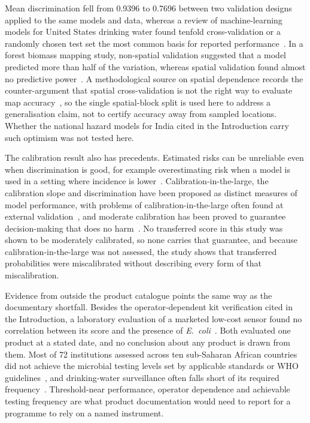 \documentclass[10pt,letterpaper]{article}
\begin{document}
Mean discrimination fell from 0.9396 to 0.7696 between two validation designs applied to the same models and data, whereas a review of machine-learning models for United States drinking water found tenfold cross-validation or a randomly chosen test set the most common basis for reported performance~\cite{Hu2023}. In a forest biomass mapping study, non-spatial validation suggested that a model predicted more than half of the variation, whereas spatial validation found almost no predictive power~\cite{Ploton2020}. A methodological source on spatial dependence records the counter-argument that spatial cross-validation is not the right way to evaluate map accuracy~\cite{MeyerPebesma2022}, so the single spatial-block split is used here to address a generalisation claim, not to certify accuracy away from sampled locations. Whether the national hazard models for India cited in the Introduction carry such optimism was not tested here.

The calibration result also has precedents. Estimated risks can be unreliable even when discrimination is good, for example overestimating risk when a model is used in a setting where incidence is lower~\cite{VanCalster2019}. Calibration-in-the-large, the calibration slope and discrimination have been proposed as distinct measures of model performance, with problems of calibration-in-the-large often found at external validation~\cite{SteyerbergVergouwe2014}, and moderate calibration has been proved to guarantee decision-making that does no harm~\cite{VanCalster2016}. No transferred score in this study was shown to be moderately calibrated, so none carries that guarantee, and because calibration-in-the-large was not assessed, the study shows that transferred probabilities were miscalibrated without describing every form of that miscalibration.

Evidence from outside the product catalogue points the same way as the documentary shortfall. Besides the operator-dependent kit verification cited in the Introduction, a laboratory evaluation of a marketed low-cost sensor found no correlation between its score and the presence of \textit{E.~coli}~\cite{Purvis2026-PLOSW0000442}. Both evaluated one product at a stated date, and no conclusion about any product is drawn from them. Most of 72 institutions assessed across ten sub-Saharan African countries did not achieve the microbial testing levels set by applicable standards or WHO guidelines~\cite{Peletz2016}, and drinking-water surveillance often falls short of its required frequency~\cite{GLAAS2025}. Threshold-near performance, operator dependence and achievable testing frequency are what product documentation would need to report for a programme to rely on a named instrument.
\end{document}
